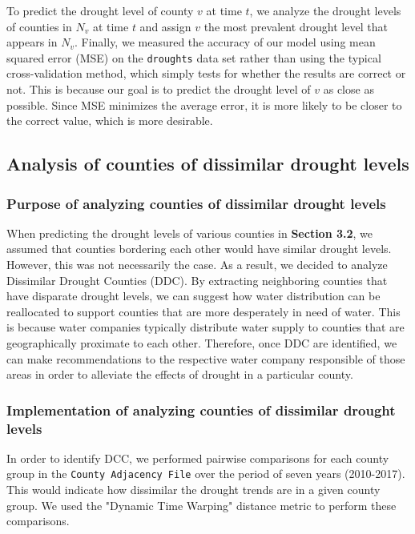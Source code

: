 \documentclass{article}
\begin{document}
To predict the drought level of county $v$ at time $t$, we analyze the drought levels of counties in $N_v$ at time $t$ and assign $v$ the most prevalent drought level that appears in $N_v$. Finally, we measured the accuracy of our model using mean squared error (MSE) on the \texttt{droughts} data set rather than using the typical cross-validation method, which simply tests for whether the results are correct or not. This is because our goal is to predict the drought level of $v$ as close as possible. Since MSE minimizes the average error, it is more likely to be closer to the correct value, which is more desirable.

\subsection{Analysis of counties of dissimilar drought levels}
\subsubsection{Purpose of analyzing counties of dissimilar drought levels}
When predicting the drought levels of various counties in \textbf{Section 3.2}, we assumed that counties bordering each other would have similar drought levels. However, this was not necessarily the case. As a result, we decided to analyze Dissimilar Drought Counties (DDC). By extracting neighboring counties that have disparate drought levels, we can suggest how water distribution can be reallocated to support counties that are more desperately in need of water. This is because water companies typically distribute water supply to counties that are geographically proximate to each other. Therefore, once DDC are identified, we can make recommendations to the respective water company responsible of those areas in order to alleviate the effects of drought in a particular county.
\subsubsection{Implementation of analyzing counties of dissimilar drought levels}
In order to identify DCC, we performed pairwise comparisons for each county group in the \texttt{County Adjacency File} over the period of seven years (2010-2017). This would indicate how dissimilar the drought trends are in a given county group. We used the "Dynamic Time Warping" distance metric to perform these comparisons.
\end{document}
